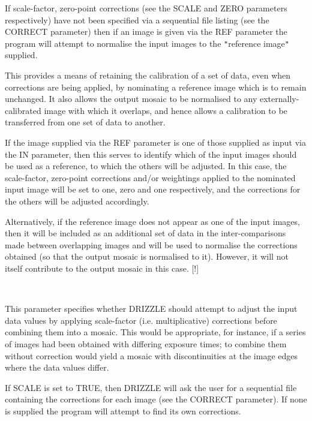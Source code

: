 \documentclass[twoside,11pt]{article}
\renewcommand{\_}{\texttt{\symbol{95}}}
\newcommand{\sstsubsection}[1]{ \item[{#1}] \mbox{} \\}
\newcommand{\sstsubsection}[1]{\item[{#1}]}
\begin{document}
{{{         If scale-factor, zero-point corrections (see the SCALE and ZERO
         parameters respectively) have not been specified via a sequential
         file listing (see the CORRECT parameter) then if an image is given
         via the REF parameter the program will attempt to normalise the
         input images to the {\tt "}reference image{\tt "} supplied.

         This provides a means of retaining the calibration of a set of
         data, even when corrections are being applied, by nominating a
         reference image which is to remain unchanged. It also allows the
         output mosaic to be normalised to any externally-calibrated
         image with which it overlaps, and hence allows a calibration to
         be transferred from one set of data to another.

         If the image supplied via the REF parameter is one of those
         supplied as input via the IN parameter, then this serves to
         identify which of the input images should be used as a
         reference, to which the others will be adjusted. In this case,
         the scale-factor, zero-point corrections and/or weightings
         applied to the nominated input image will be set to one, zero and
         one respectively, and the corrections for the others will be adjusted
         accordingly.

         Alternatively, if the reference image does not appear as one of
         the input images, then it will be included as an additional set
         of data in the inter-comparisons made between overlapping images
         and will be used to normalise the corrections obtained (so
         that the output mosaic is normalised to it). However, it will
         not itself contribute to the output mosaic in this case.
         [!]
      }
      \sstsubsection{
         SCALE = \_LOGICAL (Read)
      }{
         This parameter specifies whether DRIZZLE should attempt to
         adjust the input data values by applying scale-factor (i.e.
         multiplicative) corrections before combining them into a
         mosaic. This would be appropriate, for instance, if a series
         of images had been obtained with differing exposure times; to
         combine them without correction would yield a mosaic with
         discontinuities at the image edges where the data values
         differ.

         If SCALE is set to TRUE, then DRIZZLE will ask the user for a
         sequential file containing the corrections for each image (see
         the CORRECT parameter). If none is supplied the program will
         attempt to find its own corrections.

}}}
\end{document}

